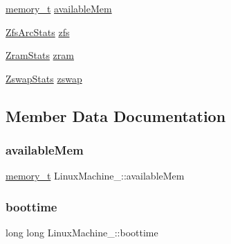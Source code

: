 \begin{DoxyCompactItemize}
\hyperlink{Machine_8h_ac8c2c5995f64727051f4034a810e5b07}{memory\+\_\+t} \hyperlink{structLinuxMachine___a5fbcd53ea357d7bf9d861a20b8491eca}{available\+Mem}
\item 
\hyperlink{ZfsArcStats_8h_a2adeccbbba50329f61d34f355e5faddc}{Zfs\+Arc\+Stats} \hyperlink{structLinuxMachine___afe18771dfc5352b17d406684ffde417e}{zfs}
\item 
\hyperlink{ZramStats_8h_a6d52e5ca55176157f75983edcee3edb3}{Zram\+Stats} \hyperlink{structLinuxMachine___a5118fe9fa61b7db30c667a58b2ede233}{zram}
\item 
\hyperlink{ZswapStats_8h_ad2bd350512b2d43b858fc4632f2c4b26}{Zswap\+Stats} \hyperlink{structLinuxMachine___a4b5e481f544c0e56bad364c25eac8751}{zswap}
\end{DoxyCompactItemize}


\subsection{Member Data Documentation}
\mbox{\label{structLinuxMachine___a5fbcd53ea357d7bf9d861a20b8491eca}} 
\subsubsection{\texorpdfstring{available\+Mem}{availableMem}}
{\footnotesize\ttfamily \hyperlink{Machine_8h_ac8c2c5995f64727051f4034a810e5b07}{memory\+\_\+t} Linux\+Machine\+\_\+\+::available\+Mem}

\mbox{\label{structLinuxMachine___a428a0a0f05b7ed288241c6b14d1fef9f}} 
\subsubsection{\texorpdfstring{boottime}{boottime}}
{\footnotesize\ttfamily long long Linux\+Machine\+\_\+\+::boottime}

\mbox{\label{structLinuxMachine___acd4587e839e6f26ce683934143550a1a}} 
